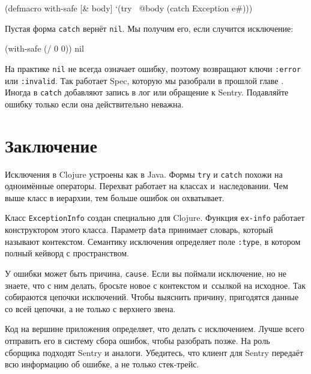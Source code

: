 
\begin{english}
  \begin{clojure}
(defmacro with-safe [& body]
  `(try
     ~@body
     (catch Exception e#)))
  \end{clojure}
\end{english}

\noindent
Пустая форма \verb|catch| вернёт \verb|nil|. Мы получим его, если случится
исключение:

\begin{english}
  \begin{clojure}
(with-safe (/ 0 0))
nil
  \end{clojure}
\end{english}

На практике \verb|nil| не всегда означает ошибку, поэтому возвращают ключи
\verb|:error| или \verb|:invalid|. Так работает Spec, которую мы разобрали в
прошлой главе . Иногда в \verb|catch| добавляют запись в лог
или обращение к Sentry. Подавляйте ошибку только если она действительно неважна.

\section{Заключение}

Исключения в Clojure устроены как в Java. Формы \verb|try| и \verb|catch| похожи
на одноимённые операторы. Перехват работает на классах и~наследовании. Чем выше
класс в иерархии, тем больше ошибок он охватывает.

Класс \verb|ExceptionInfo| создан специально для Clojure. Функция \verb|ex-info|
работает конструктором этого класса. Параметр \verb|data| принимает словарь,
который называют контекстом. Семантику исключения определяет поле \verb|:type|,
в котором полный кейворд с пространством.

У ошибки может быть причина, \verb|cause|. Если вы поймали исключение, но не
знаете, что с ним делать, бросьте новое с контекстом и~ссылкой на исходное. Так
собираются цепочки исключений. Чтобы выяснить причину, пригодятся данные со всей
цепочки, а не только с верхнего звена.

Код на вершине приложения определяет, что делать с исключением. Лучше всего
отправить его в систему сбора ошибок, чтобы разобрать позже. На роль сборщика
подходят Sentry и аналоги. Убедитесь, что клиент для Sentry передаёт всю
информацию об ошибке, а не только стек-трейс.

